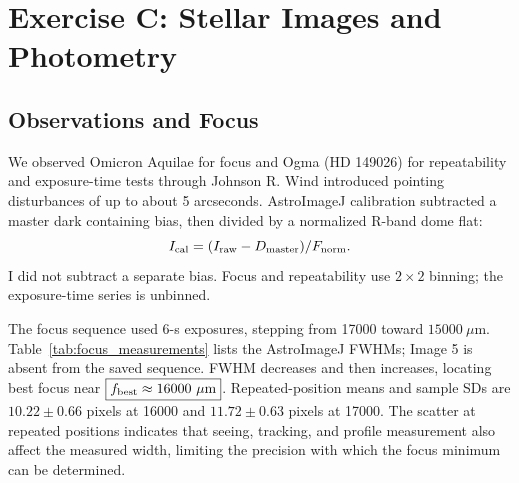 \documentclass[12pt,letterpaper,twocolumn]{article}
\begin{document}
\section{Exercise C: Stellar Images and Photometry}
\subsection{Observations and Focus}
We observed Omicron Aquilae for focus and Ogma (HD 149026) for
repeatability and exposure-time tests through Johnson R. Wind
introduced pointing disturbances of up to about 5 arcseconds.
AstroImageJ calibration subtracted a master dark containing bias,
then divided by a normalized R-band dome flat:
\begin{equation}
I_{\rm cal}=(I_{\rm raw}-D_{\rm master})/F_{\rm norm}.
\end{equation}
I did not subtract a separate bias. Focus and repeatability use
$2\times2$ binning; the exposure-time series is unbinned.

The focus sequence used 6-s exposures, stepping from 17000 toward
$15000~\mu\mathrm{m}$. Table~\ref{tab:focus_measurements} lists the
AstroImageJ FWHMs; Image 5 is absent from the saved sequence.
FWHM decreases and then increases, locating best focus near
$\boxed{f_{\rm best}\approx16000~\mu\mathrm{m}}$. Repeated-position means and sample SDs are
$10.22\pm0.66$ pixels at 16000 and $11.72\pm0.63$ pixels at 17000.
The scatter at repeated positions indicates that seeing, tracking,
and profile measurement also affect the measured width, limiting the
precision with which the focus minimum can be determined.
\end{document}
